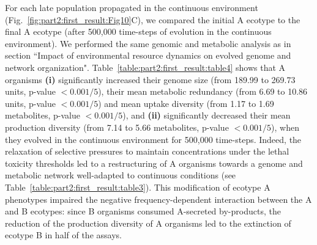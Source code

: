For each late population propagated in the continuous environment (Fig.~\ref{fig:part2:first_result:Fig10}C), we compared the initial A ecotype to the final A ecotype (after 500,000 time-steps of evolution in the continuous environment). We performed the same genomic and metabolic analysis as in section ``Impact of environmental resource dynamics on evolved genome and network organization". Table~\ref{table:part2:first_result:table4} shows that A organisms \textbf{(i)} significantly increased their genome size (from 189.99 to 269.73 units, p-value $< 0.001/5$), their mean metabolic redundancy (from 6.69 to 10.86 units, p-value $< 0.001/5$) and mean uptake diversity (from 1.17 to 1.69 metabolites, p-value $< 0.001/5$), and \textbf{(ii)} significantly decreased their mean production diversity (from 7.14 to 5.66 metabolites, p-value $< 0.001/5$), when they evolved in the continuous environment for 500,000 time-steps. Indeed, the relaxation of selective pressures to maintain concentrations under the lethal toxicity thresholds led to a restructuring of A organisms towards a genome and metabolic network well-adapted to continuous conditions (see Table~\ref{table:part2:first_result:table3}). This modification of ecotype A phenotypes impaired the negative frequency-dependent interaction between the A and B ecotypes: since B organisms consumed A-secreted by-products, the reduction of the production diversity of A organisms led to the extinction of ecotype B in half of the assays.

